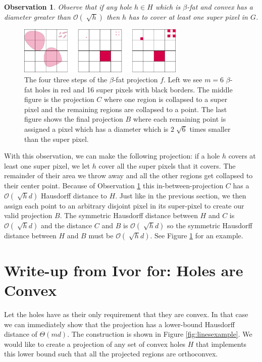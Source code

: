 \documentclass[a4paper, UKenglish]{lipics-v2018}
\newtheorem{observation}{Observation}
\begin{document}
\begin{observation}
\label{obs:covering}
Observe that if any hole $h \in H$ which is $\beta$-fat and convex has a diameter greater than $\mathcal{O}(\sqrt[]{h})$ then $h$ has to cover at least one super pixel in $G$. 
\end{observation}

\begin{figure}[H]
\centering
\includegraphics[width=300px]{Figures/fatprojection.png}
\caption{The four three steps of the $\beta$-fat projection $f$. Left we see $m=6$ $\beta$-fat holes in red and 16 super pixels with black borders. The middle figure is the projection $C$ where one region is collapsed to a super pixel and the remaining regions are collapsed to a point. The last figure shows the final projection $B$ where each remaining point is assigned a pixel which has a diameter which is $2\sqrt[]{6}$ times smaller than the super pixel. }
\label{fig:fatprojection}
\end{figure}


With this observation, we can make the following projection: if a hole $h$ covers at least one super pixel, we let $h$ cover all the super pixels that it covers. The remainder of their area we throw away and all the other regions get collapsed to their center point. Because of Observation \ref{obs:covering} this in-between-projection $C$ has a $\mathcal{O}(\sqrt[]{h}d)$ Hausdorff distance to $H$.
Just like in the previous section, we then assign each point to an arbitrary disjoint pixel in its super-pixel to create our valid projection $B$. The symmetric Hausdorff distance between $H$ and $C$ is $\mathcal{O}(\sqrt[]{h}d)$ and the distance $C$ and $B$ is $\mathcal{O}(\sqrt[]{h}d)$ so the symmetric Hausdorff distance between $H$ and $B$ must be $\mathcal{O}(\sqrt[]{h}d)$. See Figure \ref{fig:fatprojection} for an example.



\section{Write-up from Ivor for: Holes are Convex}



Let the holes have as their only requirement that they are convex. In that case we can immediately show that the projection has a lower-bound Hausdorff distance of $\Theta(md)$. The construction is shown in Figure \ref{fig:linesexample}. We would like to create a projection of any set of convex holes $H$ that implements this lower bound such that all the projected regions are orthoconvex.
\end{document}

